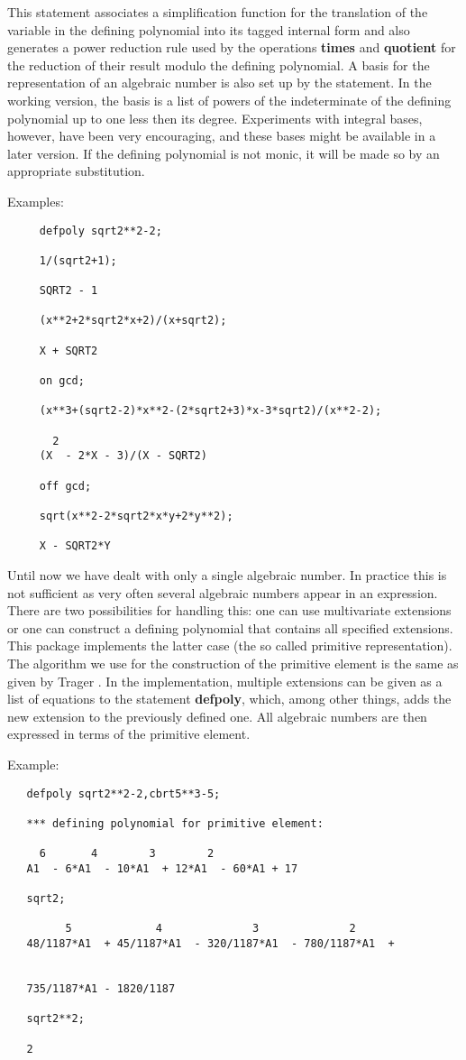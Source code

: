 This statement associates a simplification function for the
translation of the variable in the defining polynomial into its tagged
internal form and also generates a power reduction rule used by the
operations {\bf times} and {\bf quotient} for the reduction of their
result modulo the defining polynomial.  A basis for the representation
of an algebraic number is also set up by the statement.  In the
working version, the basis is a list of powers of the indeterminate of
the defining polynomial up to one less then its degree.  Experiments
with integral bases, however, have been very encouraging, and these
bases might be available in a later version.  If the defining
polynomial is not monic, it will be made so by an appropriate
substitution.

Examples:
\begin{verbatim}
     defpoly sqrt2**2-2;

     1/(sqrt2+1);

     SQRT2 - 1

     (x**2+2*sqrt2*x+2)/(x+sqrt2);

     X + SQRT2

     on gcd;

     (x**3+(sqrt2-2)*x**2-(2*sqrt2+3)*x-3*sqrt2)/(x**2-2);

       2
     (X  - 2*X - 3)/(X - SQRT2)

     off gcd;

     sqrt(x**2-2*sqrt2*x*y+2*y**2);

     X - SQRT2*Y
\end{verbatim}

Until now we have dealt with only a single algebraic number.  In practice
this is not sufficient as very often several algebraic numbers appear in an
expression.  There are two possibilities for handling this: one can use
multivariate extensions \cite{Davenport:81} or one can construct a defining
polynomial that contains all specified extensions.  This package implements
the latter case (the so called primitive representation).  The algorithm we
use for the construction of the primitive element is the same as given by
Trager \cite{Trager:76}.  In the implementation, multiple extensions can be
given as a list of equations to the statement {\bf defpoly}, which, among other
things, adds the new extension to the previously defined one.  All
algebraic numbers are then expressed in terms of the primitive element.

Example:

\begin{verbatim}
   defpoly sqrt2**2-2,cbrt5**3-5;

   *** defining polynomial for primitive element:

     6       4        3        2
   A1  - 6*A1  - 10*A1  + 12*A1  - 60*A1 + 17

   sqrt2;

         5             4              3              2
   48/1187*A1  + 45/1187*A1  - 320/1187*A1  - 780/1187*A1  +


   735/1187*A1 - 1820/1187

   sqrt2**2;

   2
\end{verbatim}

